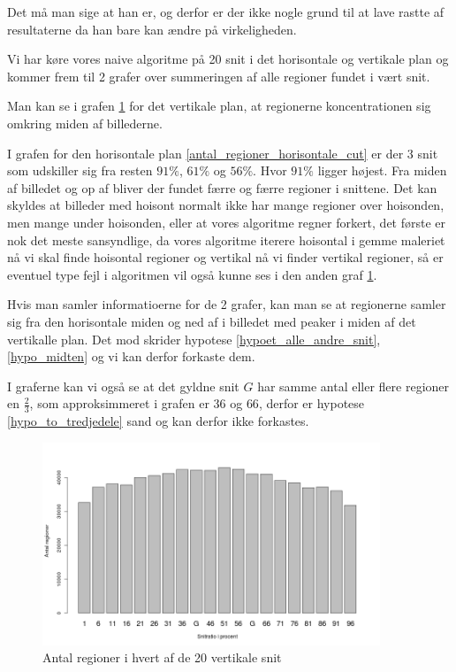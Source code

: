 Det må man sige at han er, og derfor er der ikke nogle grund til at lave
rastte af resultaterne da han bare kan ændre på virkeligheden.

Vi har køre vores naive algoritme på 20 snit i det horisontale og
vertikale plan og kommer frem til 2 grafer over summeringen af alle
regioner fundet i vært snit. 

Man kan se i grafen \ref{antal_regioner_vertikale_cut} for det vertikale
plan, at regionerne koncentrationen sig omkring miden af billederne.

I grafen for den horisontale plan \ref{antal_regioner_horisontale_cut}
er der 3 snit som udskiller sig fra resten $91\%$, $61\%$ og $56\%$.
Hvor $91\%$ ligger højest. Fra miden af billedet og op af bliver der
fundet færre og færre regioner i snittene. Det kan skyldes at billeder med hoisont normalt ikke har mange regioner over hoisonden, men mange under hoisonden, eller at vores algoritme regner forkert, det første er nok det meste sansyndlige, da vores algoritme iterere hoisontal i gemme maleriet nå vi skal finde hoisontal regioner og vertikal nå vi finder vertikal regioner, så er eventuel type fejl i algoritmen vil også kunne ses i den anden graf \ref{antal_regioner_vertikale_cut}.

Hvis man samler informatioerne for de 2 grafer, kan man se at regionerne
samler sig fra den horisontale miden og ned af i billedet med peaker i
miden af det vertikalle plan. Det mod skrider hypotese \ref{hypoet_alle_andre_snit},\ref{hypo_midten} 
og vi kan derfor forkaste dem.

I graferne kan vi også se at det gyldne snit $G$ har samme antal eller
flere regioner en $\frac{2}{3}$, som approksimmeret i grafen er $36$ og
$66$, derfor er hypotese \ref{hypo_to_tredjedele} sand og kan derfor ikke forkastes.

\begin{figure}[h!]
	\begin{center}
		\includegraphics[width=0.9\textwidth]{afsnit/resultater/billeder/cut0cut1eatsperratio.png}
	\end{center}
	\caption{Antal regioner i hvert af de 20 vertikale snit}
	\label{antal_regioner_vertikale_cut}
\end{figure}

